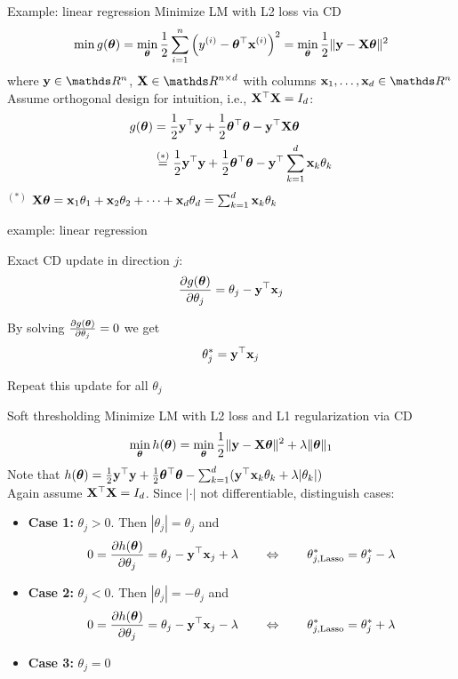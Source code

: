 \documentclass[11pt,compress,t,notes=noshow, xcolor=table]{beamer}
\begin{document}
\begin{frame2}{Example: linear regression}
Minimize LM with L2 loss via CD
$$\min g(\bm{\theta}) = \min_{\bm{\theta}} \frac{1}{2}\sum\limits_{i=1}^n \left(y^{(i)} - \bm{\theta}^\top \mathbf{x}^{(i)}\right)^2 = \min_{\bm{\theta}} \frac{1}{2}\|\mathbf{y} - \mathbf{X} \bm{\theta}\|^2 $$
where $\yv \in \R^n$, $\Xmat \in \R^{n \times d}$ with columns $\xv_1, \ldots, \xv_d \in \R^n$\\
\lz
Assume orthogonal design for intuition, i.e., $\mathbf{X}^\top \mathbf{X} = I_d$:
\begin{align*}
g(\bm{\theta}) &= \frac{1}{2}\mathbf{y}^\top \mathbf{y} + \frac{1}{2}\bm{\theta}^\top \bm{\theta} - \mathbf{y}^\top \mathbf{X} \bm{\theta}  \\
&\overset{(*)}{=} \frac{1}{2}\mathbf{y}^\top \mathbf{y} + \frac{1}{2}\bm{\theta}^\top \bm{\theta} - \mathbf{y}^\top \sum_{k = 1}^d \mathbf{x}_k \theta_k 
\end{align*}
$^{(*)}$ $\mathbf{X} \bm{\theta} = \mathbf{x}_1 \theta_1 + \mathbf{x}_2 \theta_2 + \cdots + \mathbf{x}_d \theta_d = \sum_{k = 1}^d \mathbf{x}_k \theta_k$
\end{frame2}

\begin{framei}{example: linear regression}
\item Exact CD update in direction $j$:
$$\frac{\partial{g}(\bm{\theta})}{\partial \theta_j} = \theta_j - \mathbf{y}^\top \mathbf{x}_j$$
\item By solving $\frac{\partial{g}(\bm{\theta})}{\partial \theta_j} = 0$ we get $$\theta_j^\ast = \mathbf{y}^\top \mathbf{x}_j$$
\item Repeat this update for all $\theta_j$
\end{framei}

\begin{frame2}{Soft thresholding}
Minimize LM with L2 loss and L1 regularization via CD
$$\min_{\bm{\theta}} h(\bm{\theta}) = \min_{\bm{\theta}} \frac{1}{2}\|\mathbf{y} - \mathbf{X} \bm{\theta}\|^2 + \lambda \|\bm{\theta}\|_1$$
Note that $h(\bm{\theta}) = \frac{1}{2}\mathbf{y}^\top \mathbf{y} + \frac{1}{2}\bm{\theta}^\top \bm{\theta}  - \sum_{k = 1}^d (\mathbf{y}^\top \mathbf{x}_k \theta_k + \lambda|\theta_k|)$\\
Again assume $\mathbf{X}^\top \mathbf{X} = I_d$. Since $|\cdot|$ not differentiable, distinguish cases:
\lz
{\footnotesize
\begin{itemize}
\item \textbf{Case 1:} $\theta_j > 0$.
Then $|\theta_j| = \theta_j$ and 
$$0 = \frac{\partial{h}(\bm{\theta})}{\partial \theta_j} = \theta_j - \mathbf{y}^\top \mathbf{x}_j + \lambda \qquad \Leftrightarrow \qquad \theta^\ast_{j, \text{Lasso}} = \theta^\ast_j - \lambda$$
\item \textbf{Case 2:} $\theta_j < 0$.
Then $|\theta_j| = - \theta_j$ and 
$$0 = \frac{\partial{h}(\bm{\theta})}{\partial \theta_j} = \theta_j - \mathbf{y}^\top \mathbf{x}_j - \lambda \qquad \Leftrightarrow \qquad \theta^\ast_{j, \text{Lasso}} = \theta^\ast_j + \lambda$$
\item \textbf{Case 3:} $\theta_j = 0$
\end{itemize}}
\end{frame2}
\end{document}
